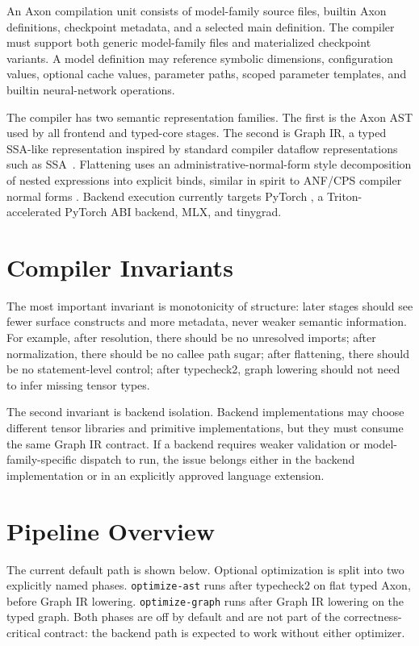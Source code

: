 \documentclass{article}
\providecommand{\citep}[1]{\cite{#1}}
\newcommand{\code}[1]{\texttt{#1}}
\begin{document}
An Axon compilation unit consists of model-family source files, builtin Axon
definitions, checkpoint metadata, and a selected main definition.  The compiler
must support both generic model-family files and materialized checkpoint
variants.  A model definition may reference symbolic dimensions, configuration
values, optional cache values, parameter paths, scoped parameter templates, and
builtin neural-network operations.

The compiler has two semantic representation families.  The first is the Axon
AST used by all frontend and typed-core stages.  The second is Graph IR, a
typed SSA-like representation inspired by standard compiler dataflow
representations such as SSA~\citep{cytron1991ssa}.  Flattening uses an
administrative-normal-form style decomposition of nested expressions into
explicit binds, similar in spirit to ANF/CPS compiler normal forms
\citep{sabry1992anf}.  Backend execution currently targets PyTorch
\citep{paszke2019pytorch}, a Triton-accelerated PyTorch ABI backend, MLX, and
tinygrad.

\section{Compiler Invariants}

The most important invariant is monotonicity of structure: later stages should
see fewer surface constructs and more metadata, never weaker semantic
information.  For example, after resolution, there should be no unresolved
imports; after normalization, there should be no callee path sugar; after
flattening, there should be no statement-level control; after typecheck2, graph
lowering should not need to infer missing tensor types.

The second invariant is backend isolation.  Backend implementations may choose
different tensor libraries and primitive implementations, but they must consume
the same Graph IR contract.  If a backend requires weaker validation or
model-family-specific dispatch to run, the issue belongs either in the backend
implementation or in an explicitly approved language extension.

\section{Pipeline Overview}

The current default path is shown below.  Optional optimization is split into
two explicitly named phases.  \code{optimize-ast} runs after typecheck2 on flat
typed Axon, before Graph IR lowering.  \code{optimize-graph} runs after Graph
IR lowering on the typed graph.  Both phases are off by default and are not
part of the correctness-critical contract: the backend path is expected to
work without either optimizer.
\end{document}
